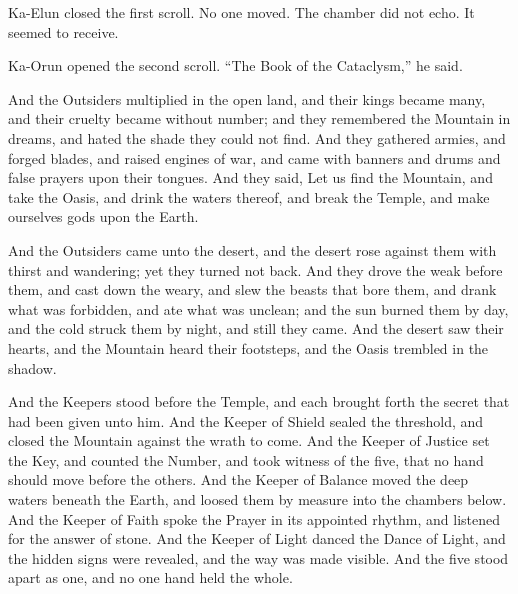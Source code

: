 Ka-Elun closed the first scroll. No one moved. The chamber did not echo. It seemed to receive.\par

Ka-Orun opened the second scroll. ``The Book of the Cataclysm,'' he said.\par

\begin{scripture}
And the Outsiders multiplied in the open land, and their kings became many, and their cruelty became without number; and they remembered the Mountain in dreams, and hated the shade they could not find.
And they gathered armies, and forged blades, and raised engines of war, and came with banners and drums and false prayers upon their tongues.
And they said, Let us find the Mountain, and take the Oasis, and drink the waters thereof, and break the Temple, and make ourselves gods upon the Earth.
\end{scripture}

\begin{scripture}
And the Outsiders came unto the desert, and the desert rose against them with thirst and wandering; yet they turned not back.
And they drove the weak before them, and cast down the weary, and slew the beasts that bore them, and drank what was forbidden, and ate what was unclean; and the sun burned them by day, and the cold struck them by night, and still they came.
And the desert saw their hearts, and the Mountain heard their footsteps, and the Oasis trembled in the shadow.
\end{scripture}

\begin{scripture}
And the Keepers stood before the Temple, and each brought forth the secret that had been given unto him.
And the Keeper of Shield sealed the threshold, and closed the Mountain against the wrath to come.
And the Keeper of Justice set the Key, and counted the Number, and took witness of the five, that no hand should move before the others.
And the Keeper of Balance moved the deep waters beneath the Earth, and loosed them by measure into the chambers below.
And the Keeper of Faith spoke the Prayer in its appointed rhythm, and listened for the answer of stone.
And the Keeper of Light danced the Dance of Light, and the hidden signs were revealed, and the way was made visible.
And the five stood apart as one, and no one hand held the whole.
\end{scripture}

